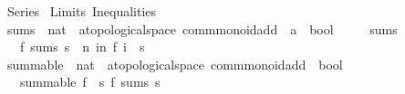 %
\begin{isabellebody}%
%
%
\isadelimdocument
%
\endisadelimdocument
%
\isatagdocument
%
\isamarkuptrue%
%
\endisatagdocument
{\isafolddocument}%
%
\isadelimdocument
%
\endisadelimdocument
%
\isadelimtheory
%
\endisadelimtheory
%
\isatagtheory
{}\isamarkupfalse%
\ Series\isanewline
{}\ Limits\ Inequalities\isanewline
{}%
\endisatagtheory
{\isafoldtheory}%
%
\isadelimtheory
%
\endisadelimtheory
%
\isadelimdocument
%
\endisadelimdocument
%
\isatagdocument
%
\isamarkuptrue%
%
\endisatagdocument
{\isafolddocument}%
%
\isadelimdocument
%
\endisadelimdocument
{}\isamarkupfalse%
\ sums\ {\isacharcolon}{\kern0pt}{\isacharcolon}{\kern0pt}\ {\isachardoublequoteopen}{\isacharparenleft}{\kern0pt}nat\ {\isasymRightarrow}\ {\isacharprime}{\kern0pt}a{\isacharcolon}{\kern0pt}{\isacharcolon}{\kern0pt}{\isacharbraceleft}{\kern0pt}topological{\isacharunderscore}{\kern0pt}space{\isacharcomma}{\kern0pt}\ comm{\isacharunderscore}{\kern0pt}monoid{\isacharunderscore}{\kern0pt}add{\isacharbraceright}{\kern0pt}{\isacharparenright}{\kern0pt}\ {\isasymRightarrow}\ {\isacharprime}{\kern0pt}a\ {\isasymRightarrow}\ bool{\isachardoublequoteclose}\isanewline
\ \ \ \ {\isacharparenleft}{\kern0pt}\ {\isachardoublequoteopen}sums{\isachardoublequoteclose}\ {}{}{\isacharparenright}{\kern0pt}\isanewline
\ \ \ {\isachardoublequoteopen}f\ sums\ s\ {\isasymlongleftrightarrow}\ {\isacharparenleft}{\kern0pt}{\isasymlambda}n{\isachardot}{\kern0pt}\ {\isasymSum}i{\isacharless}{\kern0pt}n{\isachardot}{\kern0pt}\ f\ i{\isacharparenright}{\kern0pt}\ {\isasymlonglonglongrightarrow}\ s{\isachardoublequoteclose}\isanewline
\isanewline
{}\isamarkupfalse%
\ summable\ {\isacharcolon}{\kern0pt}{\isacharcolon}{\kern0pt}\ {\isachardoublequoteopen}{\isacharparenleft}{\kern0pt}nat\ {\isasymRightarrow}\ {\isacharprime}{\kern0pt}a{\isacharcolon}{\kern0pt}{\isacharcolon}{\kern0pt}{\isacharbraceleft}{\kern0pt}topological{\isacharunderscore}{\kern0pt}space{\isacharcomma}{\kern0pt}\ comm{\isacharunderscore}{\kern0pt}monoid{\isacharunderscore}{\kern0pt}add{\isacharbraceright}{\kern0pt}{\isacharparenright}{\kern0pt}\ {\isasymRightarrow}\ bool{\isachardoublequoteclose}\isanewline
\ \ \ {\isachardoublequoteopen}summable\ f\ {\isasymlongleftrightarrow}\ {\isacharparenleft}{\kern0pt}{\isasymexists}s{\isachardot}{\kern0pt}\ f\ sums\ s{\isacharparenright}{\kern0pt}{\isachardoublequoteclose}\isanewline

\end{isabellebody}
